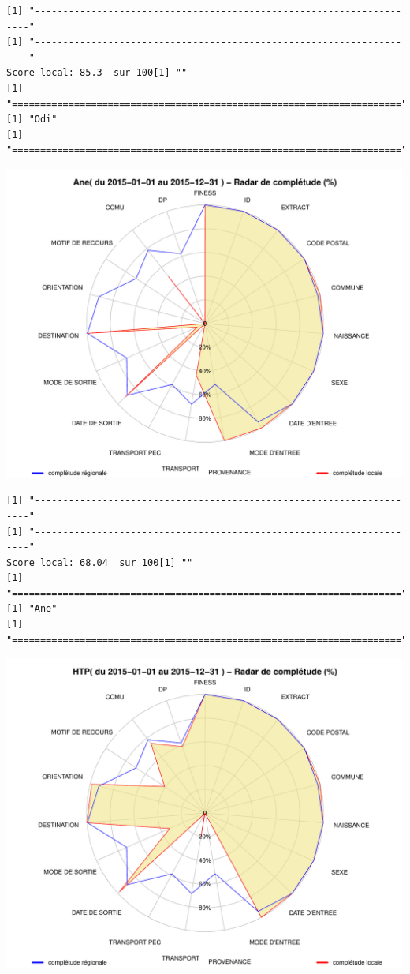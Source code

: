 \documentclass[]{article}
\begin{document}
\begin{verbatim}
[1] "---------------------------------------------------------------------"
[1] "---------------------------------------------------------------------"
Score local: 85.3  sur 100[1] ""
[1] "====================================================================="
[1] "Odi"
[1] "====================================================================="
\end{verbatim}

\includegraphics{completude_files/figure-latex/finess-14.pdf}

\begin{verbatim}
[1] "---------------------------------------------------------------------"
[1] "---------------------------------------------------------------------"
Score local: 68.04  sur 100[1] ""
[1] "====================================================================="
[1] "Ane"
[1] "====================================================================="
\end{verbatim}

\includegraphics{completude_files/figure-latex/finess-15.pdf}
\end{document}
